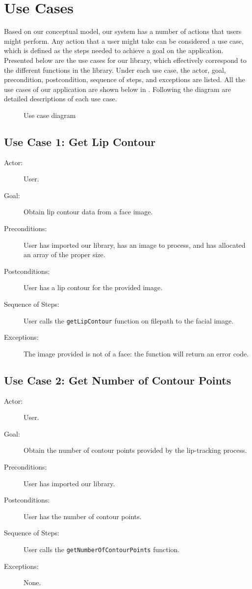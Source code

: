 \chapter{Use Cases}
Based on our conceptual model, our system has a number of actions that users might perform. Any action that a user might take can be considered a use case, which is defined as the steps needed to achieve a goal on the application. Presented below are the use cases for our library, which effectively correspond to the different functions in the library. Under each use case, the actor, goal, precondition, postcondition, sequence of steps, and exceptions are listed. All the use cases of our application are shown below in . Following the diagram are detailed descriptions of each use case.


\begin{figure}[!h]
\noindent\centering\resizebox{0.8\textwidth}{!}{
  
}
\caption{Use case diagram}
\label{fig:use-cases}
\end{figure}

\section{Use Case 1: Get Lip Contour}

\begin{description}
  \item[Actor:] User.
  \item[Goal:] Obtain lip contour data from a face image.
  \item[Preconditions:] User has imported our library, has an image to process, and has allocated an array of the proper size.
  \item[Postconditions:] User has a lip contour for the provided image.
  \item[Sequence of Steps:] User calls the \texttt{getLipContour} function on filepath to the facial image.
  \item[Exceptions:] The image provided is not of a face: the function will return an error code.
\end{description}


\section{Use Case 2: Get Number of Contour Points}

\begin{description}
	\item[Actor:] User.
	\item[Goal:] Obtain the number of contour points provided by the lip-tracking process.
	\item[Preconditions:] User has imported our library.
	\item[Postconditions:] User has the number of contour points.
	\item[Sequence of Steps:] User calls the \texttt{getNumberOfContourPoints} function.
	\item[Exceptions:] None.
\end{description}


